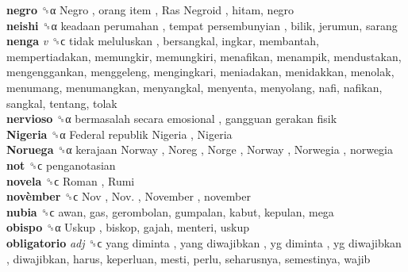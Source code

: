 \textbf{negro} ␝α   Negro ,  orang item ,  Ras Negroid , hitam, negro  \\
\textbf{neishi} ␝α   keadaan perumahan ,  tempat persembunyian , bilik, jerumun, sarang  \\
\textbf{nenga} \emph{v}  ␝ϲ   tidak meluluskan , bersangkal, ingkar, membantah, mempertiadakan, memungkir, memungkiri, menafikan, menampik, mendustakan, mengenggankan, menggeleng, mengingkari, meniadakan, menidakkan, menolak, menumang, menumangkan, menyangkal, menyenta, menyolang, nafi, nafikan, sangkal, tentang, tolak  \\
\textbf{nervioso} ␝α   bermasalah secara emosional ,  gangguan gerakan fisik   \\
\textbf{Nigeria} ␝α   Federal republik Nigeria ,  Nigeria   \\
\textbf{Noruega} ␝α   kerajaan Norway ,  Noreg ,  Norge ,  Norway ,  Norwegia , norwegia  \\
\textbf{not} ␝ϲ  penganotasian  \\
\textbf{novela} ␝ϲ   Roman ,  Rumi   \\
\textbf{novèmber} ␝ϲ   Nov ,  Nov. ,  November , november  \\
\textbf{nubia} ␝ϲ  awan, gas, gerombolan, gumpalan, kabut, kepulan, mega  \\
\textbf{obispo} ␝α   Uskup , biskop, gajah, menteri, uskup  \\
\textbf{obligatorio} \emph{adj}  ␝ϲ   yang diminta ,  yang diwajibkan ,  yg diminta ,  yg diwajibkan , diwajibkan, harus, keperluan, mesti, perlu, seharusnya, semestinya, wajib  \\
